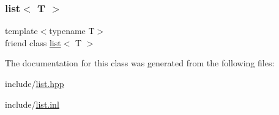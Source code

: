 \subsubsection{\texorpdfstring{list$<$ T $>$}{list< T >}}
{\footnotesize\ttfamily template$<$typename T$>$ \\
friend class \mbox{\hyperlink{classsc_1_1list}{list}}$<$ T $>$\hspace{0.3cm}{\ttfamily [friend]}}



The documentation for this class was generated from the following files\+:\begin{DoxyCompactItemize}
\item 
include/\mbox{\hyperlink{list_8hpp}{list.\+hpp}}\item 
include/\mbox{\hyperlink{list_8inl}{list.\+inl}}\end{DoxyCompactItemize}
